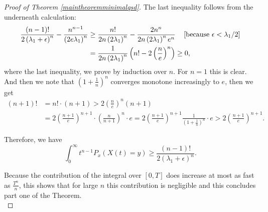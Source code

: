 \documentclass[12pt,a4paper]{scrartcl}
\numberwithin{equation}{section}
\begin{document}
\begin{proof}[Proof of Theorem \ref{maintheoremminimalqsd}]
The last inequality follows from the underneath calculation:
\begin{align*}
\frac{\left(n-1\right)!}{2\left(\lambda_1+\epsilon\right)^n} - \frac{n^{n-1}}{\left(2e\lambda_1\right)^n} &\geq \frac{n!}{2n\left(2\lambda_1\right)^n} - \frac{2n^n}{2n\left(2\lambda_1\right)^n e^n} \quad \left[\textnormal{because } \epsilon < \lambda_1/2 \right]\\
&= \frac{1}{2n \left(2 \lambda_1 \right)^n} \left(n! - 2\left(\frac{n}{e}\right)^n \right) \geq 0,
\end{align*}
where the last inequality, we prove by induction over $n$. For $n = 1$ this is clear. And then we note that $\left(1+\frac{1}{n} \right)^n$ converges monotone increasingly to $e$, then we get
\begin{align*}
\left(n+1\right)! &= n! \cdot \left(n+1\right) > 2 \left( \frac{n}{e} \right)^n \left(n+1\right) \\
&= 2\left(\frac{n+1}{e} \right)^{n+1} \cdot \left(\frac{n}{n+1}\right)^n \cdot e = 2\left(\frac{n+1}{e} \right)^{n+1} \frac{1}{\left(1 + \frac{1}{n} \right)^n} \cdot e > 2\left(\frac{n+1}{e} \right)^{n+1}.
\end{align*}

Therefore, we have
\begin{equation} \label{eq:increasesfast}
\int_0^{\infty} t^{n-1} P_x\left(X\left(t\right)=y \right) \geq \frac{\left(n-1\right)!}{2\left(\lambda_1+\epsilon\right)^n}.
\end{equation}

Because the contribution of the integral over $\left[0,T\right]$ does increase at most as fast as $\frac{T^n}{n}$, this shows that for large $n$ this contribution is negligible and this concludes part one of the Theorem. \\[2ex]


\end{proof}
\end{document}
